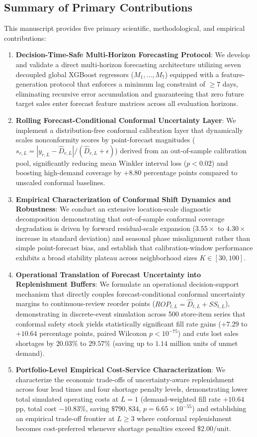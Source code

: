 \subsection{Summary of Primary Contributions}
This manuscript provides five primary scientific, methodological, and empirical contributions:

\begin{enumerate}
    \item \textbf{Decision-Time-Safe Multi-Horizon Forecasting Protocol}: We develop and validate a direct multi-horizon forecasting architecture utilizing seven decoupled global XGBoost regressors ($M_1,\dots,M_7$) equipped with a feature-generation protocol that enforces a minimum lag constraint of $\ge 7$ days, eliminating recursive error accumulation and guaranteeing that zero future target sales enter forecast feature matrices across all evaluation horizons.
    \item \textbf{Rolling Forecast-Conditional Conformal Uncertainty Layer}: We implement a distribution-free conformal calibration layer that dynamically scales nonconformity scores by point-forecast magnitudes ($s_{r,L} = |y_{r,L} - \hat{D}_{r,L}| / (\hat{D}_{r,L} + \epsilon)$) derived from an out-of-sample calibration pool, significantly reducing mean Winkler interval loss ($p < 0.02$) and boosting high-demand coverage by $+8.80$ percentage points compared to unscaled conformal baselines.
    \item \textbf{Empirical Characterization of Conformal Shift Dynamics and Robustness}: We conduct an extensive location-scale diagnostic decomposition demonstrating that out-of-sample conformal coverage degradation is driven by forward residual-scale expansion ($3.55\times$ to $4.30\times$ increase in standard deviation) and seasonal phase misalignment rather than simple point-forecast bias, and establish that calibration-window performance exhibits a broad stability plateau across neighborhood sizes $K \in [30, 100]$.
    \item \textbf{Operational Translation of Forecast Uncertainty into Replenishment Buffers}: We formulate an operational decision-support mechanism that directly couples forecast-conditional conformal uncertainty margins to continuous-review reorder points ($ROP_{t,L} = \hat{D}_{t,L} + SS_{t,L}$), demonstrating in discrete-event simulation across 500 store-item series that conformal safety stock yields statistically significant fill rate gains ($+7.29$ to $+10.64$ percentage points, paired Wilcoxon $p < 10^{-75}$) and cuts lost sales shortages by $20.03\%$ to $29.57\%$ (saving up to $1.14$ million units of unmet demand).
    \item \textbf{Portfolio-Level Empirical Cost-Service Characterization}: We characterize the economic trade-offs of uncertainty-aware replenishment across four lead times and four shortage penalty levels, demonstrating lower total simulated operating costs at $L=1$ (demand-weighted fill rate $+10.64$ pp, total cost $-10.83\%$, saving $\$790,834$, $p = 6.65 \times 10^{-55}$) and establishing an empirical trade-off frontier at $L \ge 3$ where conformal replenishment becomes cost-preferred whenever shortage penalties exceed $\$2.00/\text{unit}$.
\end{enumerate}

